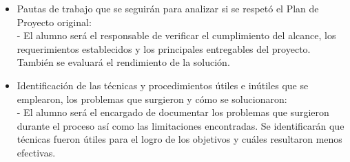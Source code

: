 \documentclass[
11pt, %
]{charter}
\begin{document}
\begin{itemize}
	\item Pautas de trabajo que se seguirán para analizar si se respetó el Plan de Proyecto original:\\
	 - El alumno será el responsable de verificar el cumplimiento del alcance, los requerimientos establecidos y los principales entregables del proyecto. También se evaluará el rendimiento de la solución.
	\item Identificación de las técnicas y procedimientos útiles e inútiles que se emplearon, los problemas que surgieron y cómo se solucionaron:\\
	 - El alumno será el encargado de documentar los problemas que surgieron durante el proceso así como las limitaciones encontradas. Se identificarán que técnicas fueron útiles para el logro de los objetivos y cuáles resultaron menos efectivas.
\end{itemize}
\end{document}
